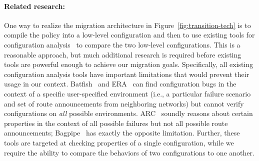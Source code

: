 
\paragraph*{Related research:}  
One way to realize the migration architecture in Figure~\ref{fig:transition-tech} is to compile the \Name policy into a low-level configuration
and then to use existing tools for configuration analysis~\cite{batfish,arc,bagpipe,era} to compare the two low-level configurations.  This is a reasonable approach, but much additional research is required before existing
tools are powerful enough to achieve our migration goals.  Specifically, all existing configuration analysis tools have important limitations that would prevent their usage in our context.  Batfish~\cite{batfish} and ERA~\cite{era} can find configuration bugs in the context of a specific user-specified environment (i.e., a particular failure scenario and set of route announcements from neighboring networks) but cannot verify configurations on \emph{all} possible environments.  ARC~\cite{arc} soundly reasons about certain properties in the context of all possible failures but not all possible route announcements; Bagpipe~\cite{bagpipe} has exactly the opposite limitation.  
Further, these tools are targeted at checking properties of a single configuration, while we require the ability to compare the behaviors of two configurations to one another.


